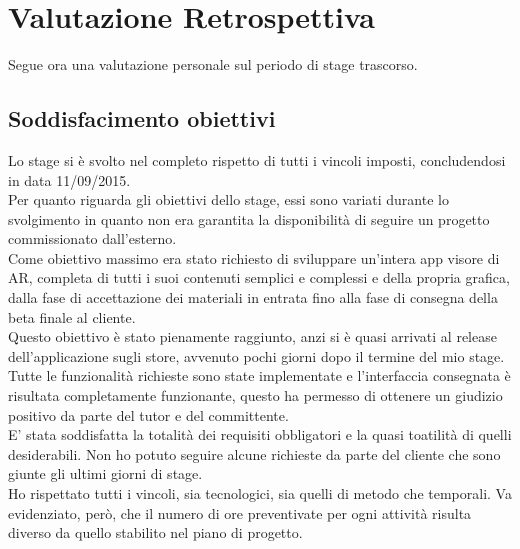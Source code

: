 \section{Valutazione Retrospettiva}
Segue ora una valutazione personale sul periodo di stage trascorso.
\subsection{Soddisfacimento obiettivi}
Lo stage si \`e svolto nel completo rispetto di tutti i vincoli imposti, concludendosi in data 11/09/2015. \\
Per quanto riguarda gli obiettivi dello stage, essi sono variati durante lo svolgimento in quanto non era garantita la disponibilit\`a di seguire un progetto commissionato dall'esterno.\\
Come obiettivo massimo era stato richiesto di sviluppare un’intera app visore di AR, completa di tutti i suoi contenuti semplici e complessi e della propria grafica, dalla fase di accettazione dei materiali in entrata fino alla fase di consegna della beta finale al cliente.\\
Questo obiettivo \`e stato pienamente raggiunto, anzi si \`e quasi arrivati al release dell'applicazione sugli store, avvenuto pochi giorni dopo il termine del mio stage.\\
Tutte le funzionalit\`a richieste sono state implementate e l’interfaccia consegnata \`e risultata completamente funzionante, questo ha permesso di ottenere un giudizio positivo da parte del tutor e del committente.\\
E' stata soddisfatta la totalit\`a dei requisiti obbligatori e la quasi toatilit\`a di quelli desiderabili. Non ho potuto seguire alcune richieste da parte del cliente che sono giunte gli ultimi giorni di stage.\\
Ho rispettato tutti i vincoli, sia tecnologici, sia quelli di metodo che temporali. Va evidenziato, per\`o, che il numero di ore preventivate per ogni attivit\`a risulta diverso da quello stabilito nel piano di progetto.\\

